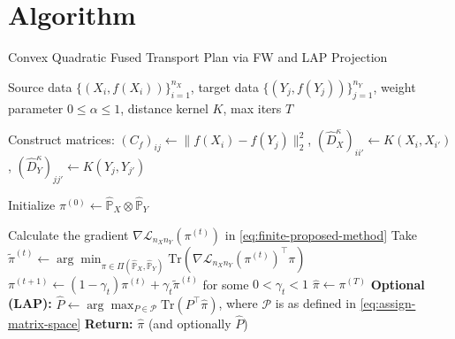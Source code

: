\documentclass{article}
\begin{document}
\section{Algorithm}\label{sec:Algorithm}
\begin{algorithm}[t]
	\caption{Convex Quadratic Fused Transport Plan via FW and LAP Projection}
	\label{alg:proposed-algorithm}
	\begin{algorithmic}[1]
		\Require Source data $\{(X_i, f(X_i))\}_{i=1}^{n_X}$, target data $\{(Y_j, f(Y_j))\}_{j=1}^{n_Y}$, weight parameter $0 \leq \alpha \leq 1$, distance kernel $K$, max iters $T$
		
		\State Construct matrices:
		\Statex \hspace{\algorithmicindent} $(C_f)_{ij} \gets \|f(X_i)-f(Y_j)\|_2^2$, \quad
		$(\hat{D}_X^{\kappa})_{ii'} \gets K(X_i,X_{i'})$, \quad
		$(\hat{D}_Y^{\kappa})_{jj'} \gets K(Y_j,Y_{j'})$
		
		\State Initialize $\pi^{(0)} \gets \hat{\mathbb{P}}_X \otimes \hat{\mathbb{P}}_Y$
		
		\State Calculate the gradient $\nabla \mathcal{L}_{n_Xn_Y}(\pi^{(t)})$ in \eqref{eq:finite-proposed-method}
		\State Take $\tilde{\pi}^{(t)} \gets \arg\min_{\pi \in \Pi(\hat{\mathbb{P}}_X,\hat{\mathbb{P}}_Y)} \mathrm{Tr}(\nabla \mathcal{L}_{n_Xn_Y}(\pi^{(t)})^\top \pi)$
		\State $\pi^{(t+1)} \gets (1-\gamma_t)\pi^{(t)} + \gamma_t \tilde{\pi}^{(t)}$ for some $0 < \gamma_t < 1$
		\EndFor
		\State $\hat\pi \gets \pi^{(T)}$
		\State \textbf{Optional (LAP):} $\displaystyle
		\hat P \gets \arg\max_{P \in \mathcal{P}} \mathrm{Tr}(P^\top \hat\pi)$, where $\mathcal{P}$ is as defined in \eqref{eq:assign-matrix-space}
		\State \textbf{Return:} $\hat\pi$ (and optionally $\hat P$)
	\end{algorithmic}
\end{algorithm}
\end{document}
